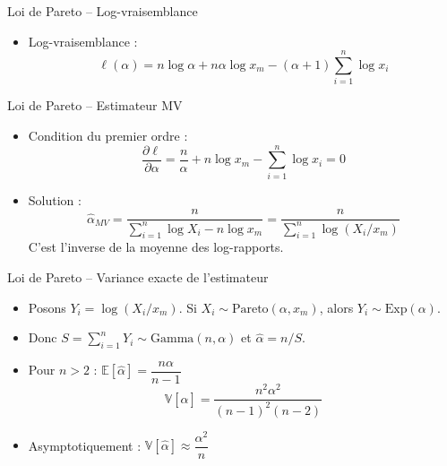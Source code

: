 \documentclass[11pt,aspectratio=169]{beamer}
\begin{document}
\begin{frame}{Loi de Pareto -- Log-vraisemblance}

\begin{itemize}

\item Log-vraisemblance :
  \[
  \ell(\alpha) = n \log \alpha + n\alpha \log x_m - (\alpha + 1)\sum_{i=1}^n \log x_i
  \]

\end{itemize}

\end{frame}

\begin{frame}{Loi de Pareto -- Estimateur MV}

\begin{itemize}

\item Condition du premier ordre :
  \[
  \frac{\partial \ell}{\partial \alpha} = \frac{n}{\alpha} + n \log x_m - \sum_{i=1}^n \log x_i = 0
  \]

\item Solution :
  \[
  \boxed{\hat{\alpha}_{MV} = \frac{n}{\sum_{i=1}^n \log X_i - n \log x_m} = \frac{n}{\sum_{i=1}^n \log(X_i/x_m)}}
  \]
  C'est l'inverse de la moyenne des log-rapports.

\end{itemize}

\end{frame}

\begin{frame}{Loi de Pareto -- Variance exacte de l'estimateur}

\begin{itemize}

\item Posons $Y_i = \log(X_i/x_m)$. Si $X_i \sim \text{Pareto}(\alpha, x_m)$, alors $Y_i \sim \text{Exp}(\alpha)$.\newline

\item Donc $S = \sum_{i=1}^n Y_i \sim \text{Gamma}(n, \alpha)$ et $\hat{\alpha} = n/S$.\newline

\item Pour $n > 2$ : $\mathbb{E}[\hat{\alpha}] = \dfrac{n\alpha}{n-1}$
  \[
  \boxed{\mathbb{V}[\hat{\alpha}] = \frac{n^2 \alpha^2}{(n-1)^2(n-2)}}
  \]

\item Asymptotiquement : $\mathbb{V}[\hat{\alpha}] \approx \dfrac{\alpha^2}{n}$

\end{itemize}

\end{frame}
\end{document}
